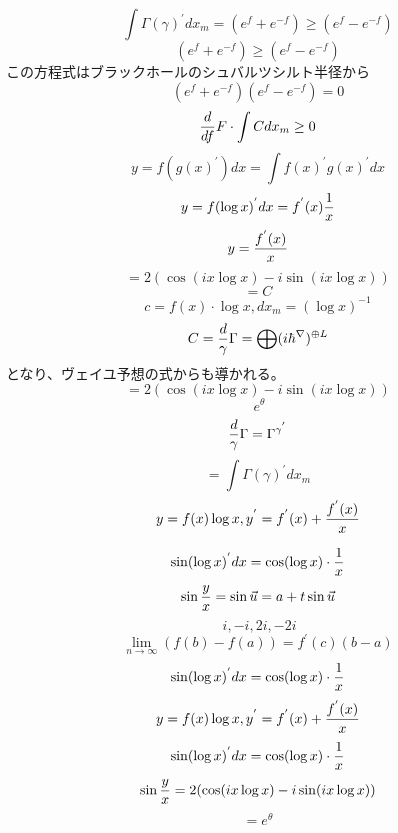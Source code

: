 \documentclass{jsarticle}
\begin{document}
    $$ \int \Gamma(\gamma)^{'}dx_m = (e^f + e^{-f}) \ge (e^{f} - e^{-f}) $$
    $$(e^f + e^{-f}) \ge (e^{f} - e^{-f}) $$ 
    この方程式はブラックホールのシュバルツシルト半径から
    $$ (e^f + e^{-f})(e^f - e^{-f}) = 0 $$
    $$ {d \over df}F \cdot \int C dx_m \ge 0 $$
    $$ y = f(g(x)^{'})dx = \int f(x)^{'}g(x)^{'}dx $$
    $$ y = f(\log x)^{'}dx = f^{'}(x){1 \over x} $$
    $$ y = {{f^{'}(x)} \over x} $$
    $$ = 2(\cos (i x \log x) - i \sin (i x \log x)) $$
    $$ = C $$
    $$ c = f(x)\cdot \log x, dx_m = (\log x)^{-1}  $$
    $$ C = {d \over \gamma}\Gamma = \bigoplus (i \hbar^{\nabla})^{\oplus L} $$
    となり、ヴェイユ予想の式からも導かれる。
    $$ = 2(\cos (i x \log x) - i \sin (i x \log x)) $$
    $$ ~ e^{\theta} $$
    $$ {d \over \gamma}\Gamma = \Gamma^{{\gamma}^{'}} $$
    $$ = \int \Gamma(\gamma)^{'}dx_m $$
    $$ y = f(x)\log x, y^{'} = f^{'}(x) + {f^{'}(x) \over x} $$

    $$ \sin (\log x)^{'} dx = \cos (\log x)\cdot {1 \over x} $$
    $$ \sin{y \over x} = \sin \vec{u} = a + t \sin \vec{u} $$
    $$ ~ i, -i, 2i, -2i $$
    $$ \lim_{n \to \infty}(f(b) - f(a)) = f^{'}(c)(b - a) $$
    $$ \sin (\log x)^{'}dx = \cos (\log x)\cdot {1 \over x} $$
    $$ y = f(x)\log x, y^{'} = f^{'}(x) + {f^{'}(x) \over x} $$
    $$ \sin (\log x)^{'} dx = \cos (\log x)\cdot {1 \over x} $$
    $$ \sin{y \over x} =  2(\cos (i x \log x) - i \sin (i x \log x)) $$
    $$ = e^{\theta} $$
\end{document}
